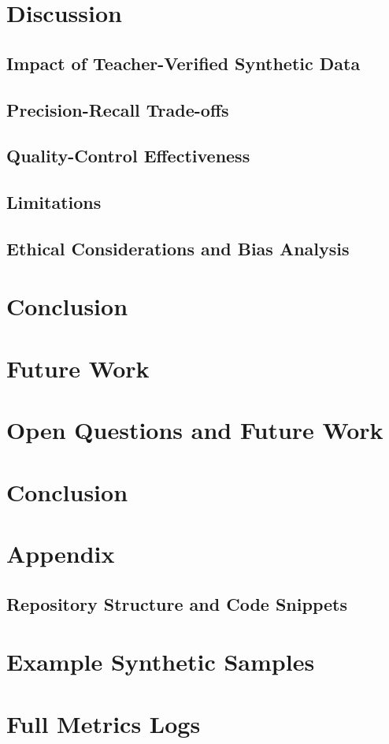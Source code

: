 \documentclass[11pt]{article}
\begin{document}
\section{Discussion}
\subsection{Impact of Teacher-Verified Synthetic Data}
\subsection{Precision-Recall Trade-offs}
\subsection{Quality-Control Effectiveness}
\subsection{Limitations}
\subsection{Ethical Considerations and Bias Analysis}

\section{Conclusion}

\section{Future Work}

\section{Open Questions and Future Work}\label{sec:openq}

\section{Conclusion}

\appendix
\section{Appendix}
\subsection{Repository Structure and Code Snippets}
\section{Example Synthetic Samples}
\section{Full Metrics Logs}



\end{document}
